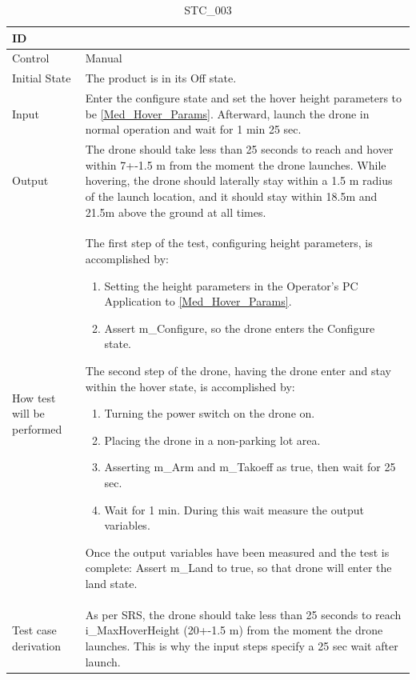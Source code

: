 \documentclass[12pt, titlepage]{article}
\begin{document}
\begin{table}[!h]
\begin{center}
\caption {STC\_003}
\label{tab:STC_003}
\begin{tabular}{ | m{1.5cm} | m{15cm} | } 
\hline
ID & \nameref{tab:STC_003}  \\ 
\hline
Control & Manual\\ 
\hline
Initial State & The product is in its Off state.
 \\ 
\hline
Input & Enter the configure state and set the hover height parameters to be \ref{Med_Hover_Params}. Afterward, launch the drone in normal operation and wait for 1 min 25 sec. \\ 
\hline
Output & The drone should take less than 25 seconds to reach and hover within 7+-1.5 m from the moment the drone launches. While hovering, the drone should laterally stay within a 1.5 m radius of the launch location, and it should stay within 18.5m and 21.5m above the ground at all times. 
 \\ 
\hline
How test will be performed &
The first step of the test, configuring height parameters, is accomplished by:
\begin{enumerate}[topsep=0pt,itemsep=-1ex,partopsep=1ex,parsep=1ex]
    \item Setting the height parameters in the Operator's PC Application to \ref{Med_Hover_Params}.
    \item Assert m\_Configure, so the drone enters the Configure state.
\end{enumerate}
The second step of the drone, having the drone enter and stay within the hover state, is accomplished by:
\begin{enumerate}[topsep=0pt,itemsep=-1ex,partopsep=1ex,parsep=1ex]
	\item Turning the power switch on the drone on. 
	\item Placing the drone in a non-parking lot area. 
	\item Asserting m\_Arm and m\_Takoeff as true, then wait for 25 sec.
	\item Wait for 1 min. During this wait measure the output variables.
\end{enumerate}
Once the output variables have been measured and the test is complete:
Assert m\_Land to true, so that drone will enter the land state.\\ 
\hline
Test case derivation & As per SRS, the drone should take less than 25 seconds to reach i\_MaxHoverHeight (20+-1.5 m) from the moment the drone launches. This is why the input steps specify a 25 sec wait after launch.


\end{tabular}
\end{center}
\end{table}
\end{document}
